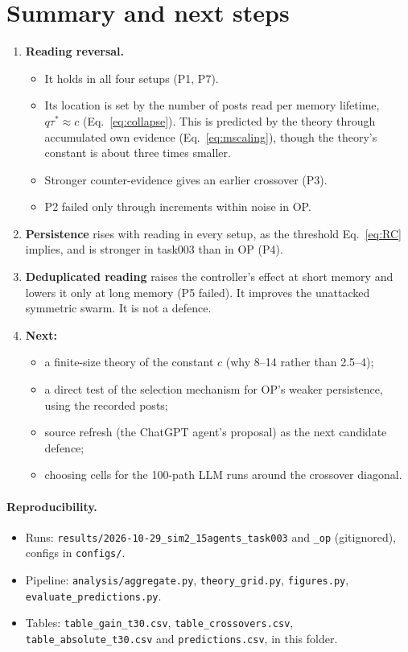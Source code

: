 \documentclass[10pt,a4paper]{article}
\begin{document}
\section{Summary and next steps}
\begin{enumerate}
\item \textbf{Reading reversal.}
  \begin{itemize}
  \item It holds in all four setups (P1, P7).
  \item Its location is set by the number of posts read per memory lifetime, $q\tau^*\approx c$
    (Eq.~\ref{eq:collapse}). This is predicted by the theory through accumulated own evidence (Eq.~\ref{eq:mscaling}),
    though the theory's constant is about three times smaller.
  \item Stronger counter-evidence gives an earlier crossover (P3).
  \item P2 failed only through increments within noise in OP.
  \end{itemize}
\item \textbf{Persistence} rises with reading in every setup, as the threshold Eq.~\eqref{eq:RC} implies, and is
  stronger in task003 than in OP (P4).
\item \textbf{Deduplicated reading} raises the controller's effect at short memory and lowers it only at long memory
  (P5 failed). It improves the unattacked symmetric swarm. It is not a defence.
\item \textbf{Next:}
  \begin{itemize}
  \item a finite-size theory of the constant $c$ (why 8--14 rather than 2.5--4);
  \item a direct test of the selection mechanism for OP's weaker persistence, using the recorded posts;
  \item source refresh (the ChatGPT agent's proposal) as the next candidate defence;
  \item choosing cells for the 100-path LLM runs around the crossover diagonal.
  \end{itemize}
\end{enumerate}

\paragraph{Reproducibility.}
\begin{itemize}
\item Runs: \nolinkurl{results/2026-10-29_sim2_15agents_task003} and \nolinkurl{_op} (gitignored), configs in
  \nolinkurl{configs/}.
\item Pipeline: \nolinkurl{analysis/aggregate.py}, \nolinkurl{theory_grid.py}, \nolinkurl{figures.py},
  \nolinkurl{evaluate_predictions.py}.
\item Tables: \nolinkurl{table_gain_t30.csv}, \nolinkurl{table_crossovers.csv}, \nolinkurl{table_absolute_t30.csv} and
  \nolinkurl{predictions.csv}, in this folder.
\end{itemize}
\end{document}
